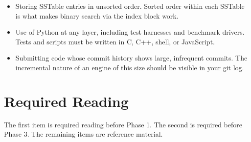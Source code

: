 \documentclass[11pt,a4paper]{article}
\begin{document}
\begin{notebox}
\begin{itemize}
\item Storing SSTable entries in unsorted order. Sorted order within each SSTable is what makes binary search via the index block work.

\item Use of Python at any layer, including test harnesses and benchmark drivers. Tests and scripts must be written in C, C++, shell, or JavaScript.

\item Submitting code whose commit history shows large, infrequent commits. The incremental nature of an engine of this size should be visible in your git log.
\end{itemize}
\end{notebox}

\section{Required Reading}

The first item is required reading before Phase 1. The second is required before Phase 3. The remaining items are reference material.
\end{document}
